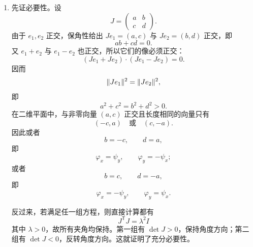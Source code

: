\begin{xsolution}
\begin{enumerate}[label=(\arabic*)]
  \item 先证必要性。设
  \[
    J=\begin{pmatrix}a&b\\c&d\end{pmatrix}.
  \]
  由于 $e_1,e_2$ 正交，保角性给出 $Je_1=(a,c)$ 与 $Je_2=(b,d)$ 正交，即
  \[
    ab+cd=0.
  \]
  又 $e_1+e_2$ 与 $e_1-e_2$ 也正交，所以它们的像必须正交：
  \[
    (Je_1+Je_2)\cdot(Je_1-Je_2)=0.
  \]
  因而
  \[
    \lVert Je_1\rVert^2=\lVert Je_2\rVert^2,
  \]
  即
  \[
    a^2+c^2=b^2+d^2>0.
  \]
  在二维平面中，与非零向量 $(a,c)$ 正交且长度相同的向量只有
  \[
    (-c,a)
    \quad\text{或}\quad
    (c,-a).
  \]
  因此或者
  \[
    b=-c,
    \qquad d=a,
  \]
  即
  \[
    \varphi_x=\psi_y,
    \qquad
    \varphi_y=-\psi_x;
  \]
  或者
  \[
    b=c,
    \qquad d=-a,
  \]
  即
  \[
    \varphi_x=-\psi_y,
    \qquad
    \varphi_y=\psi_x.
  \]

  反过来，若满足任一组方程，则直接计算都有
  \[
    J^{\mathsf T}J=\lambda^2I
  \]
  其中 $\lambda>0$，故所有夹角均保持。第一组有 $\det J>0$，保持角度方向；第二组有 $\det J<0$，反转角度方向。这就证明了充分必要性。
\end{enumerate}
\end{xsolution}


